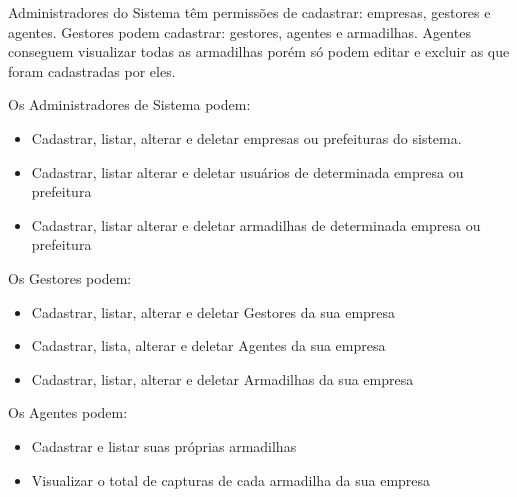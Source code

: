 \documentclass{scrreprt}
\begin{document}
	Administradores do Sistema têm permissões de cadastrar: empresas, gestores e agentes.
	Gestores podem cadastrar: gestores, agentes e armadilhas. Agentes conseguem visualizar todas as armadilhas porém só podem editar e excluir as que foram cadastradas por eles.
	
	Os Administradores de Sistema podem: 
	\begin{itemize}
		\item  Cadastrar, listar, alterar e deletar empresas ou prefeituras do sistema. 
		\item  Cadastrar, listar alterar e deletar usuários de determinada empresa ou prefeitura 
		\item  Cadastrar, listar alterar e deletar armadilhas de determinada empresa ou prefeitura
	\end{itemize}
	
	Os Gestores podem:
	\begin{itemize}
		\item  Cadastrar, listar, alterar e deletar Gestores da sua empresa
		\item  Cadastrar, lista, alterar e deletar Agentes da sua empresa
		\item  Cadastrar, listar, alterar e deletar Armadilhas da sua empresa
	\end{itemize}
	
	Os Agentes podem:
	\begin{itemize}
		\item Cadastrar e listar suas próprias armadilhas
		\item Visualizar o total de capturas de cada armadilha da sua empresa
	\end{itemize}
	
\end{document}
